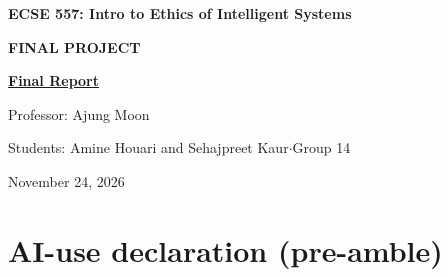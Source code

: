 \documentclass[11pt,letterpaper]{article}
\begin{document}
\thispagestyle{cover}
\vspace*{2.95in}
{\centering\fontsize{22}{27}\selectfont\bfseries ECSE 557: Intro to Ethics of Intelligent Systems\par}
\vspace{6pt}
{\centering\fontsize{16}{19}\selectfont\bfseries FINAL PROJECT\par}
\vspace{4pt}
{\centering\fontsize{16}{19}\selectfont\bfseries\underline{Final Report}\par}
\vfill
{\fontsize{14}{17}\selectfont Professor: Ajung Moon\par}
\vspace{4pt}
{\fontsize{14}{17}\selectfont Students: Amine Houari and Sehajpreet Kaur\enskip$\cdot$\enskip Group 14\par}
\vspace{28pt}
{\centering\fontsize{14}{17}\selectfont November 24, 2026\par}
\vspace*{0.05in}
\clearpage

\section{AI-use declaration (pre-amble)}
\end{document}
